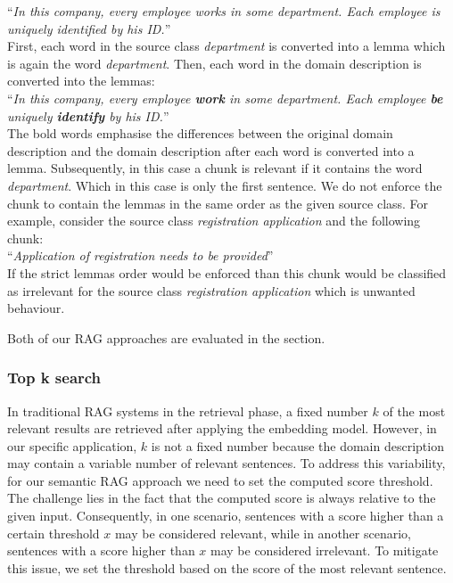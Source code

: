 ``\textit{In this company, every employee works in some department. Each employee is uniquely identified by his ID.}'' \\

First, each word in the source class \textit{department} is converted into a lemma which is again the word \textit{department}. Then, each word in the domain description is converted into the lemmas: \\

``\textit{In this company, every employee \textbf{work} in some department. Each employee \textbf{be} uniquely \textbf{identify} by his ID.}'' \\

The bold words emphasise the differences between the original domain description and the domain description after each word is converted into a lemma. Subsequently, in this case a chunk is relevant if it contains the word \textit{department}. Which in this case is only the first sentence. We do not enforce the chunk to contain the lemmas in the same order as the given source class. For example, consider the source class \textit{registration application} and the following chunk: \\

\noindent{}``\textit{Application of registration needs to be provided}'' \\

\noindent{}If the strict lemmas order would be enforced than this chunk would be classified as irrelevant for the source class \textit{registration application} which is unwanted behaviour.

Both of our RAG approaches are evaluated in the section.


\subsubsection{Top k search}
\label{sec:top_k_search}

In traditional RAG systems in the retrieval phase, a fixed number $k$ of the most relevant results are retrieved after applying the embedding model. However, in our specific application, $k$ is not a fixed number because the domain description may contain a variable number of relevant sentences. To address this variability, for our semantic RAG approach we need to set the computed score threshold. The challenge lies in the fact that the computed score is always relative to the given input. Consequently, in one scenario, sentences with a score higher than a certain threshold $x$ may be considered relevant, while in another scenario, sentences with a score higher than $x$ may be considered irrelevant. To mitigate this issue, we set the threshold based on the score of the most relevant sentence.
